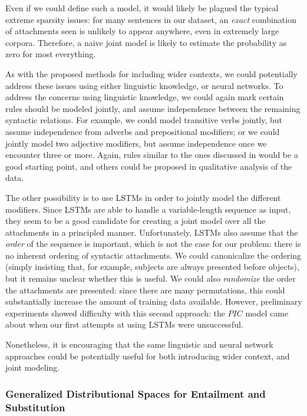 \documentclass[12pt]{article}
\begin{document}
Even if we could define such a model, it would likely be plagued the typical
extreme sparsity issues: for many sentences in our dataset, an {\em exact}
combination of attachments seen is unlikely to appear anywhere, even in
extremely large corpora. Therefore, a naive joint model is likely to estimate
the probability as zero for most everything.

As with the proposed methods for including wider contexts, we could potentially
address these issues using either linguistic knowledge, or neural networks.  To
address the concerns using linguistic knowledge, we could again mark certain
rules should be modeled jointly, and assume independence between the remaining
syntactic relations. For example, we could model transitive verbs jointly, but
assume independence from adverbs and prepositional modifiers; or we could
jointly model two adjective modifiers, but assume independence once we
encounter three or more. Again, rules similar to the ones discussed in
 would be a good starting point, and others could be
proposed in qualitative analysis of the data.

The other possibility is to use LSTMs in order to jointly model the different
modifiers. Since LSTMs are able to handle a variable-length sequence as input,
they seem to be a good candidate for creating a joint model over all the
attachments in a principled manner. Unfortunately, LSTMs also assume that the
{\em order} of the sequence is important, which is not the case for our problem:
there is no inherent ordering of syntactic attachments. We could canonicalize
the ordering (simply insisting that, for example, subjects are always presented
before objects), but it remains unclear whether this is useful. We could also
{\em randomize} the order the attachments are presented: since there are many
permutations, this could substantially increase the amount of training data
available. However, preliminary
experiments showed difficulty with this second approach: the $PIC$ model came
about when our first attempts at using LSTMs were unsuccessful.

Nonetheless, it is encouraging that the same linguistic and neural network
approaches could be potentially useful for both introducing wider context,
and joint modeling.

\subsubsection{Generalized Distributional Spaces for Entailment and Substitution}
\end{document}
